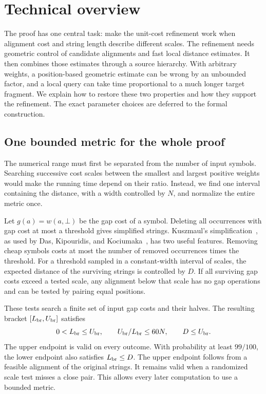\documentclass[11pt]{article}
\theoremstyle{definition}
\newcommand{\gap}{\bot}
\newcommand{\1}{\mathbf 1}
\begin{document}
\section{Technical overview}\label{paper:sec:overview}

The proof has one central task: make the unit-cost refinement work when
alignment cost and string length describe different scales.
The refinement needs geometric control of candidate alignments and fast
local distance estimates.
It then combines those estimates through a source hierarchy.
With arbitrary weights, a position-based geometric estimate can be
wrong by an unbounded factor, and a local query can take time
proportional to a much longer target fragment.
We explain how to restore these two properties and how they support the
refinement. The exact parameter choices are deferred to the formal
construction.

\subsection{One bounded metric for the whole proof}

The numerical range must first be separated from the number of input
symbols. Searching successive cost scales between the smallest and
largest positive weights would make the running time depend on their
ratio. Instead, we find one interval containing the distance, with a
width controlled by $N$, and normalize the entire metric once.

Let $g(a)=w(a,\gap)$ be the gap cost of a symbol.
Deleting all occurrences with gap cost at most a threshold gives
simplified strings.
Kuszmaul's simplification~\cite{kuszmaul2019}, as used by
Das, Kipouridis, and Kociumaka~\cite{dkk}, has two useful features.
Removing cheap symbols costs at most the number of removed occurrences
times the threshold.
For a threshold sampled in a constant-width interval of scales, the
expected distance of the surviving strings is controlled by $D$.
If all surviving gap costs exceed a tested scale, any alignment below
that scale has no gap operations and can be tested by pairing equal
positions.

These tests search a finite set of input gap costs and their halves.
The resulting bracket $[L_{\rm br},U_{\rm br}]$ satisfies
\[
 0<L_{\rm br}\le U_{\rm br},\qquad
 U_{\rm br}/L_{\rm br}\le60N,\qquad D\le U_{\rm br}.
\]
The upper endpoint is valid on every outcome.
With probability at least $99/100$, the lower endpoint also satisfies
$L_{\rm br}\le D$.
The upper endpoint follows from a feasible alignment of the original
strings. It remains valid when a randomized scale test misses a close
pair. This allows every later computation to use a bounded metric.
\end{document}
